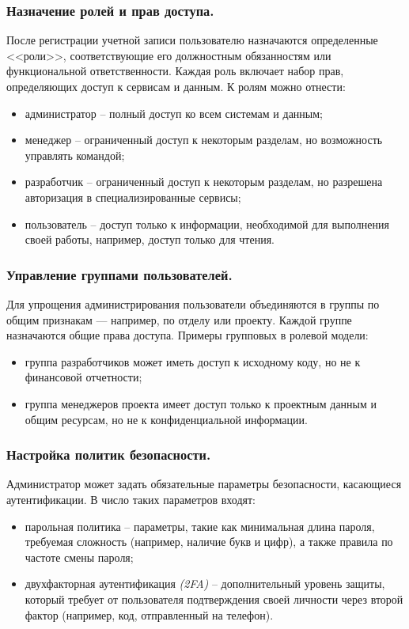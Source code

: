 \subsubsection{Назначение ролей и прав доступа.}
После регистрации учетной записи пользователю назначаются определенные <<роли>>, соответствующие его должностным обязанностям или функциональной ответственности. Каждая роль включает набор прав, определяющих доступ к сервисам и данным. К ролям можно отнести:
\begin{itemize}
    \item администратор -- полный доступ ко всем системам и данным;
    \item менеджер -- ограниченный доступ к некоторым разделам, но возможность управлять командой;
    \item разработчик -- ограниченный доступ к некоторым разделам, но разрешена авторизация в специализированные сервисы;
    \item пользователь -- доступ только к информации, необходимой для выполнения своей работы, например, доступ только для чтения.
\end{itemize}

\subsubsection{Управление группами пользователей.}
Для упрощения администрирования пользователи объединяются в группы по общим признакам — например, по отделу или проекту. Каждой группе назначаются общие права доступа. Примеры групповых в ролевой модели:
\begin{itemize}
    \item группа разработчиков может иметь доступ к исходному коду, но не к финансовой отчетности;
    \item группа менеджеров проекта имеет доступ только к проектным данным и общим ресурсам, но не к конфиденциальной информации.
\end{itemize}

\subsubsection{Настройка политик безопасности.}
Администратор может задать обязательные параметры безопасности, касающиеся аутентификации. В число таких параметров входят:
\begin{itemize}
    \item парольная политика -- параметры, такие как минимальная длина пароля, требуемая сложность (например, наличие букв и цифр), а также правила по частоте смены пароля;
    \item двухфакторная аутентификация \textit{(2FA)} -- дополнительный уровень защиты, который требует от пользователя подтверждения своей личности через второй фактор (например, код, отправленный на телефон).
\end{itemize}

